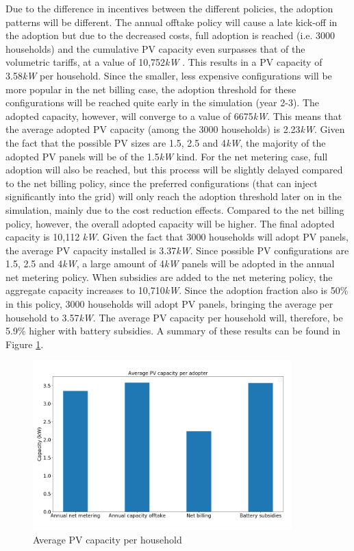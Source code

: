 Due to the difference in incentives between the different policies, the adoption patterns will be different. The annual offtake policy will cause a late kick-off in the adoption but due to the decreased costs, full adoption is reached (i.e. 3000 households) and the cumulative PV capacity even surpasses that of the volumetric tariffs, at a value of 10,752\textit{kW} . This results in a PV capacity of 3.58\textit{kW} per household. Since the smaller, less expensive configurations will be more popular in the net billing case, the adoption threshold for these configurations will be reached quite early in the simulation (year 2-3). The adopted capacity, however, will converge to a value of  6675\textit{kW}. This means that the average adopted PV capacity (among the 3000 households) is 2.23\textit{kW}. Given the fact that the possible PV sizes are 1.5, 2.5 and 4\textit{kW}, the majority of the adopted PV panels will be of the 1.5\textit{kW} kind. For the net metering case, full adoption will also be reached, but this process will be slightly delayed compared to the net billing policy, since the preferred configurations (that can inject significantly into the grid) will only reach the adoption threshold later on in the simulation, mainly due to the cost reduction effects. Compared to the net billing policy, however, the overall adopted capacity will be higher. The final adopted capacity is 10,112 \textit{kW}. Given the fact that 3000 households will adopt PV panels, the average PV capacity installed is 3.37\textit{kW}. Since possible PV configurations are 1.5, 2.5 and 4\textit{kW}, a large amount of 4\textit{kW} panels will be adopted in the annual net metering policy. When subsidies are added to the net metering policy, the aggregate capacity increases to 10,710\textit{kW}. Since the adoption fraction also is 50\% in this policy, 3000 households will adopt PV panels, bringing the average per household to 3.57\textit{kW}. The average PV capacity per household will, therefore, be 5.9\% higher with battery subsidies. A summary of these results can be found in Figure \ref{Figure:pvav}. 
\begin{figure}[h!]
\centering
\includegraphics[width=10cm]{Policies/AvPV.png}
\caption{Average PV capacity per household}
\label{Figure:pvav}
\end{figure}
